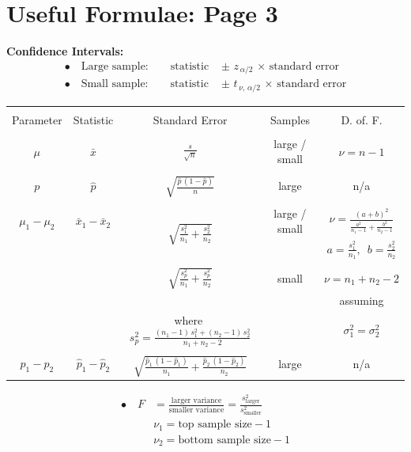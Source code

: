 \documentclass[12pt]{article}
\begin{document}
\section*{Useful Formulae: Page 3\\[0.3cm]}
{\bf Confidence Intervals:}\\[-0.8cm]
\begin{align*}
\bullet\quad \text{Large sample:} \qquad \text{statistic } &\pm\,\, z_{\,\alpha/2}\,\times\,\text{standard error} \\[0.6cm]
\bullet\quad \text{Small sample:} \qquad \text{statistic } &\pm\,\, t_{\,\nu,\,\alpha/2}\,\times\,\text{standard error}
\end{align*}
\begin{center}
\begin{tabular}{|c|c|c|c|c|}
\hline
&&&&\\[-0.1cm]
Parameter & Statistic & Standard Error & Samples & D. of. F. \\[0.3cm]
\hline
&&&&\\[-0.1cm]
$\mu$ & $\bar x$ & ${\displaystyle\frac{s}{\sqrt{n}}}$  & large / small & $\nu = n - 1$ \\[0.5cm]
\hline
&&&&\\[-0.1cm]
$p$ & $\hat p$ & \multirow{1}{*}{${\displaystyle\sqrt{\frac{\hat p\,(1-\hat p)}{n}}}$} & large & n/a \\[0.7cm]
\hline
&&&&\\[-0.1cm]
$\mu_1-\mu_2$ & $\bar x_1 - \bar x_2$ & \multirow{3}{*}{${\displaystyle\sqrt{\frac{s_1^2}{n_1}+\frac{s_2^2}{n_2}}}$} & large / small & ${\displaystyle \nu = \frac{(a+b)^2}{\frac{a^2}{n_1-1}+\frac{b^2}{n_2-1}}}$ \\[0.8cm]
&&&& ${\displaystyle a=\frac{s_1^2}{n_1}, \,\,\, b=\frac{s_2^2}{n_2}}$ \\[0.5cm]
\cline{3-5}
&&&&\\[-0.1cm]
&  & ${\displaystyle\sqrt{\frac{s_p^2}{n_1}+\frac{s_p^2}{n_2}}}$ & small & $\nu = n_1+n_2-2$ \\[0.5cm]
&&&& assuming \\[-0.2cm]
&& where\,\, ${\displaystyle s_p^2 = \frac{(n_1-1)\,s_1^2+(n_2-1)\,s_2^2}{n_1+n_2-2}}$  && $\sigma_1^2 = \sigma_2^2$ \\[0.5cm]
\hline
&&&&\\[-0.1cm]
$p_1-p_2$ & $\hat p_1 - \hat p_2$ & \multirow{2}{*}{${\displaystyle\sqrt{\frac{\hat p_1 \, (1-\hat p_1)}{n_1}+\frac{\hat p_2 \, (1-\hat p_2)}{n_2}}}$} & large & n/a\\[0.9cm]
\hline
\multicolumn{5}{c}{}\\[0.5cm]
\end{tabular}
\end{center}
\begin{align*}
\bullet\quad F &= \frac{\text{larger variance}}{\text{smaller variance}} = \frac{s_{\text{larger}}^2}{s_{\text{smaller}}^2} \\[0.3cm]
 & \nu_1 = \text{top sample size} - 1\\[0.1cm]
  & \nu_2 = \text{bottom sample size} - 1
\end{align*}
\end{document}
